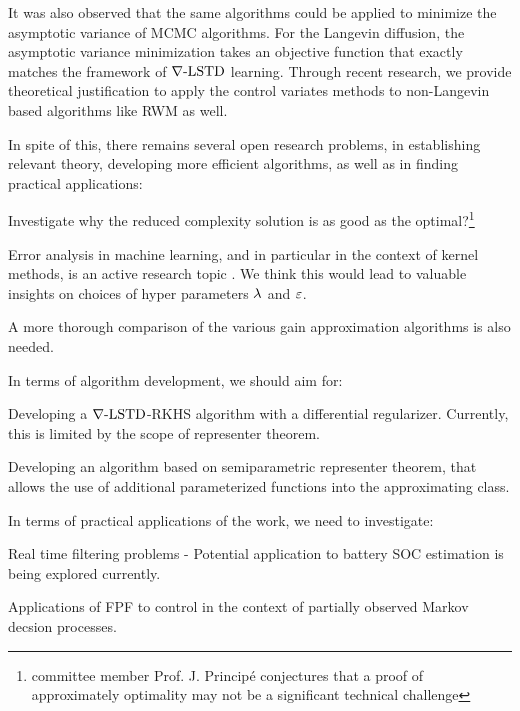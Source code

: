 It was also observed that the same algorithms could be applied to minimize the asymptotic variance of MCMC algorithms. For the Langevin diffusion, the asymptotic variance minimization takes an objective function that exactly matches the framework of $\nabla\text{-LSTD}$ learning. Through recent research, we provide theoretical justification to apply the control variates methods to non-Langevin based algorithms like RWM as well. 

In spite of this, there remains several open research problems, in establishing relevant theory, developing more efficient algorithms, as well as in finding practical applications: 
\begin{romannum}
\item Investigate why the reduced complexity solution is as good as the optimal?\footnote{committee member Prof. J. Princip\'{e} conjectures that a proof of approximately optimality may not be a significant technical challenge}
\item Error analysis in machine learning, and in particular in the context of kernel methods, is an active research topic \cite{boueli02}. We think this would lead to valuable insights on choices of hyper parameters $\lambda$ and $\varepsilon$.
\item A more thorough comparison of the various gain approximation algorithms is also needed.
\end{romannum}

In terms of algorithm development, we should aim for:
\begin{romannum}
\item Developing a $\nabla\text{-LSTD}$-RKHS algorithm with a differential regularizer. Currently, this is limited by the scope of representer theorem. 
\item Developing an algorithm based on semiparametric representer theorem, that allows the use of additional parameterized functions into the approximating class.
\end{romannum}
In terms of practical applications of the work, we need to investigate:
\begin{romannum}
\item  Real time filtering problems - Potential application to battery SOC estimation is being explored currently. 
\item Applications of FPF to control in the context of partially observed Markov decsion processes.
\end{romannum}


